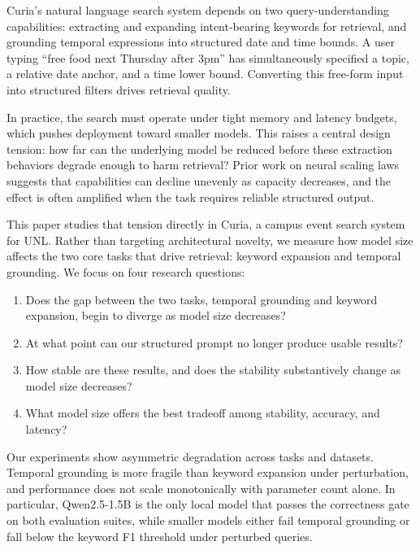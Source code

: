 \documentclass[conference]{IEEEtran}
\begin{document}
Curia's natural language search system depends on two query-understanding capabilities: extracting and expanding intent-bearing keywords for retrieval, and grounding temporal expressions into structured date and time bounds. A user typing ``free food next Thursday after 3pm'' has simultaneously specified a topic, a relative date anchor, and a time lower bound. Converting this free-form input into structured filters drives retrieval quality.

In practice, the search must operate under tight memory and latency budgets, which pushes deployment toward smaller models. This raises a central design tension: how far can the underlying model be reduced before these extraction behaviors degrade enough to harm retrieval? Prior work on neural scaling laws~\cite{kaplan2020scaling,hoffmann2022training} suggests that capabilities can decline unevenly as capacity decreases, and the effect is often amplified when the task requires reliable structured output.

This paper studies that tension directly in Curia, a campus event search system for UNL. Rather than targeting architectural novelty, we measure how model size affects the two core tasks that drive retrieval: keyword expansion and temporal grounding. We focus on four research questions:
\begin{enumerate}
    \item Does the gap between the two tasks, temporal grounding and keyword expansion, begin to diverge as model size decreases?
    \item At what point can our structured prompt no longer produce usable results?
    \item How stable are these results, and does the stability substantively change as model size decreases?
    \item What model size offers the best tradeoff among stability, accuracy, and latency?
\end{enumerate}

Our experiments show asymmetric degradation across tasks and datasets. Temporal grounding is more fragile than keyword expansion under perturbation, and performance does not scale monotonically with parameter count alone. In particular, Qwen2.5-1.5B is the only local model that passes the correctness gate on both evaluation suites, while smaller models either fail temporal grounding or fall below the keyword F1 threshold under perturbed queries.
\end{document}
